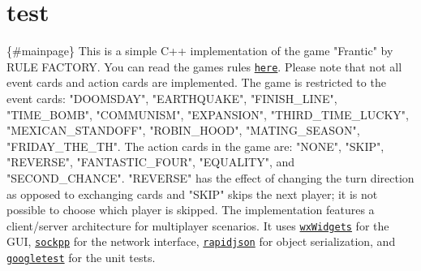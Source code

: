 \chapter{test }
\hypertarget{md_test}{}\label{md_test}
\{\#mainpage\} This is a simple C++ implementation of the game "{}\+Frantic"{} by RULE FACTORY. You can read the game\textquotesingle{}s rules \href{./docs/Regeln.pdf}{\texttt{here}}. Please note that not all event cards and action cards are implemented. The game is restricted to the event cards\+: "{}\+DOOMSDAY"{}, "{}\+EARTHQUAKE"{}, "{}\+FINISH\+\_\+\+LINE"{}, "{}\+TIME\+\_\+\+BOMB"{}, "{}\+COMMUNISM"{}, "{}\+EXPANSION"{}, "{}\+THIRD\+\_\+\+TIME\+\_\+\+LUCKY"{}, "{}\+MEXICAN\+\_\+\+STANDOFF"{}, "{}\+ROBIN\+\_\+\+HOOD"{}, "{}\+MATING\+\_\+\+SEASON"{}, "{}\+FRIDAY\+\_\+\+THE\+\_\+TH"{}. The action cards in the game are\+: "{}\+NONE"{}, "{}\+SKIP"{}, "{}\+REVERSE"{}, "{}\+FANTASTIC\+\_\+\+FOUR"{}, "{}\+EQUALITY"{}, and "{}\+SECOND\+\_\+\+CHANCE"{}. "{}\+REVERSE"{} has the effect of changing the turn direction as opposed to exchanging cards and "{}\+SKIP"{} skips the next player; it is not possible to choose which player is skipped. The implementation features a client/server architecture for multiplayer scenarios. It uses \href{https://www.wxwidgets.org/}{\texttt{wx\+Widgets}} for the GUI, \href{https://github.com/fpagliughi/sockpp}{\texttt{sockpp}} for the network interface, \href{https://rapidjson.org/md_doc_tutorial.html}{\texttt{rapidjson}} for object serialization, and \href{https://github.com/google/googletest}{\texttt{googletest}} for the unit tests. 